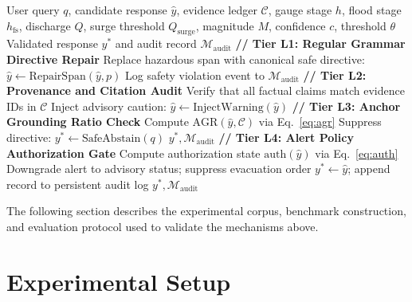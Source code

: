 \documentclass[conference]{IEEEtran}
\begin{document}
\begin{algorithm}[ht]\footnotesize
\caption{Deterministic Safety Enforcement Layer (DSEL)}
\label{alg:dsel}
\begin{algorithmic}[1]
\REQUIRE User query $q$, candidate response $\hat{y}$, evidence ledger $\mathcal{C}$, gauge stage $h$, flood stage $h_{\mathrm{fs}}$, discharge $Q$, surge threshold $Q_{\mathrm{surge}}$, magnitude $M$, confidence $c$, threshold $\theta$
\ENSURE Validated response $y^*$ and audit record $\mathcal{M}_{\mathrm{audit}}$
\STATE \textbf{// Tier L1: Regular Grammar Directive Repair}
    \STATE Replace hazardous span with canonical safe directive: $\hat{y} \leftarrow \mathrm{RepairSpan}(\hat{y}, p)$
    \STATE Log safety violation event to $\mathcal{M}_{\mathrm{audit}}$
  \ENDIF
\ENDFOR
\STATE \textbf{// Tier L2: Provenance and Citation Audit}
\STATE Verify that all factual claims match evidence IDs in $\mathcal{C}$
  \STATE Inject advisory caution: $\hat{y} \leftarrow \mathrm{InjectWarning}(\hat{y})$
\ENDIF
\STATE \textbf{// Tier L3: Anchor Grounding Ratio Check}
\STATE Compute $\mathrm{AGR}(\hat{y}, \mathcal{C})$ via Eq.~\eqref{eq:agr}
  \STATE Suppress directive: $y^* \leftarrow \mathrm{SafeAbstain}(q)$
  \RETURN $y^*, \mathcal{M}_{\mathrm{audit}}$
\ENDIF
\STATE \textbf{// Tier L4: Alert Policy Authorization Gate}
  \STATE Compute authorization state $\mathrm{auth}(\hat{y})$ via Eq.~\eqref{eq:auth}
    \STATE Downgrade alert to advisory status; suppress evacuation order
  \ENDIF
\ENDIF
\STATE $y^* \leftarrow \hat{y}$; append record to persistent audit log
\RETURN $y^*, \mathcal{M}_{\mathrm{audit}}$
\end{algorithmic}
\end{algorithm}



The following section describes the experimental corpus, benchmark construction, and evaluation protocol used to validate the mechanisms above.

\section{Experimental Setup}
\end{document}
